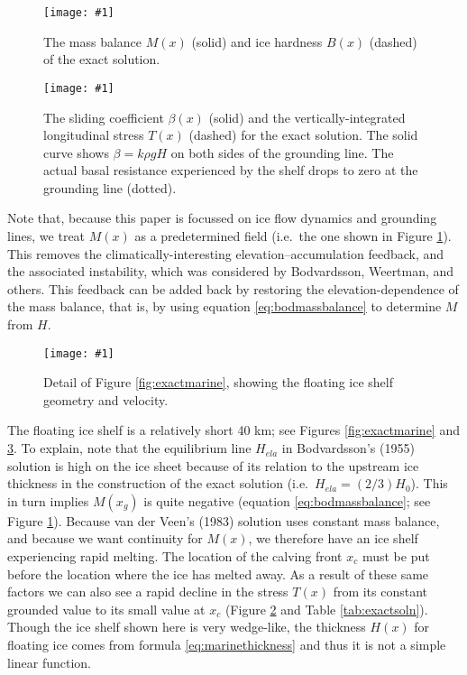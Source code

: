 \documentclass[review,letterpaper]{igs}
\newcommand{\onecol}[1]{\texttt{[image: \#1]}}
\begin{document}
\begin{figure}[ht]
\onecol{exactmarine-M-B}
\caption{The mass balance $M(x)$ (solid) and ice hardness $B(x)$ (dashed) of the exact solution.} \label{fig:exactMB}
\end{figure}

\begin{figure}[ht]
\onecol{exactmarine-beta-T}
\caption{The sliding coefficient $\beta(x)$ (solid) and the vertically-integrated longitudinal stress $T(x)$ (dashed) for the exact solution.  The solid curve shows $\beta = k \rho g H$ on both sides of the grounding line.  The actual basal resistance experienced by the shelf drops to zero at the grounding line (dotted).} \label{fig:exactbetaT}
\end{figure}

Note that, because this paper is focussed on ice flow dynamics and grounding lines, we treat $M(x)$ as a predetermined field (i.e.~the one shown in Figure \ref{fig:exactMB}).  This removes the climatically-interesting elevation--accumulation feedback, and the associated instability, which was considered by Bodvardsson, Weertman, and others.  This feedback can be added back by restoring the elevation-dependence of the mass balance, that is, by using equation \eqref{eq:bodmassbalance} to determine $M$ from $H$.

\begin{figure}[ht]
\onecol{exactmarine-geometry-detail}
\caption{Detail of Figure \ref{fig:exactmarine}, showing the floating ice shelf geometry and velocity.} \label{fig:exactmarine-detail}
\end{figure}

The floating ice shelf is a relatively short 40 km; see Figures \ref{fig:exactmarine} and \ref{fig:exactmarine-detail}.  To explain, note that the equilibrium line $H_{ela}$ in Bodvardsson's (1955) solution is high on the ice sheet because of its relation to the upstream ice thickness in the construction of the exact solution (i.e.~$H_{ela} = (2/3) H_0$).  This in turn implies $M(x_g)$ is quite negative (equation \eqref{eq:bodmassbalance}; see Figure \ref{fig:exactMB}).  Because van der Veen's (1983) solution uses constant mass balance, and because we want continuity for $M(x)$, we therefore have an ice shelf experiencing rapid melting.  The location of the calving front $x_c$ must be put before the location where the ice has melted away.  As a result of these same factors we can also see a rapid decline in the stress $T(x)$ from its constant grounded value to its small value at $x_c$ (Figure \ref{fig:exactbetaT} and Table \ref{tab:exactsoln}).  Though the ice shelf shown here is very wedge-like, the thickness $H(x)$ for floating ice comes from formula \eqref{eq:marinethickness} and thus it is not a simple linear function.
\end{document}
